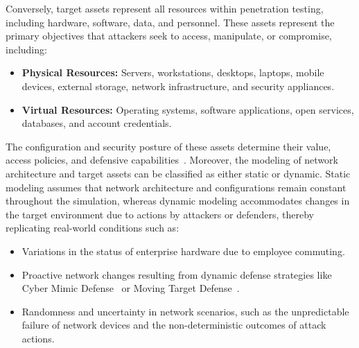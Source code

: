 

Conversely, target assets represent all resources within penetration testing, including hardware, software, data, and personnel. These assets represent the primary objectives that attackers seek to access, manipulate, or compromise, including:

\begin{itemize}
    \item \textbf{Physical Resources:} Servers, workstations, desktops, laptops, mobile devices, external storage, network infrastructure, and security appliances.
    \item \textbf{Virtual Resources:} Operating systems, software applications, open services, databases, and account credentials.
\end{itemize}

The configuration and security posture of these assets determine their value, access policies, and defensive capabilities~\cite{Guo2018Cyberspace}.
Moreover, the modeling of network architecture and target assets can be classified as either static or dynamic. Static modeling assumes that network architecture and configurations remain constant throughout the simulation, whereas dynamic modeling accommodates changes in the target environment due to actions by attackers or defenders, thereby replicating real-world conditions such as:

\begin{itemize}
    \item Variations in the status of enterprise hardware due to employee commuting.
    \item Proactive network changes resulting from dynamic defense strategies like Cyber Mimic Defense~\cite{2016Research} or Moving Target Defense~\cite{2011Moving}.
    \item Randomness and uncertainty in network scenarios, such as the unpredictable failure of network devices and the non-deterministic outcomes of attack actions.
\end{itemize}

